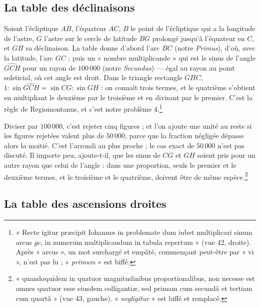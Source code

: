\documentclass[11pt,a4paper]{article}
\begin{document}
\subsection*{La table des déclinaisons}

Soient l'écliptique $AB$, l'équateur $AC$, $B$ le point de l'écliptique qui a la
longitude de l'astre, $G$ l'astre sur le cercle de latitude $BG$ prolongé jusqu'à
l'équateur en $C$, et $GH$ sa déclinaison. La table donne d'abord l'arc $BC$
(notre \emph{Primus}), d'où, avec la latitude, l'arc $GC$ ; puis un « nombre
multiplicande » qui est le sinus de l'angle $\widehat{GCH}$ pour un rayon de
$100\,000$ (notre \emph{Secundus}) — égal au rayon au point solsticial, où cet
angle est droit. Dans le triangle rectangle $GHC$, $1 : \sin\widehat{GCH} = \sin
CG : \sin GH$ : on connaît trois termes, et le quatrième s'obtient en multipliant
le deuxième par le troisième et en divisant par le premier. C'est la règle de
Regiomontanus, et c'est notre problème 4.\footnote{« Recte igitur præcipit
Iohannes in problemate dum iubet multiplicari sinum arcus $gc$, in numerum
multiplicandum in tabula repertum » (vue 42, droite). Après « arcus », un mot
surchargé et empâté, commençant peut-être par « vi », n'est pas lu ;
« \emph{primum} » est biffé.}

Diviser par $100\,000$, c'est rejeter cinq figures ; et l'on ajoute une unité au
reste si les figures rejetées valent plus de $50\,000$, parce que la fraction
négligée dépasse alors la moitié. C'est l'arrondi au plus proche ; le cas exact
de $50\,000$ n'est pas discuté. Il importe peu, ajoute-t-il, que les sinus de
$CG$ et $GH$ soient pris pour un autre rayon que celui de l'angle : dans une
proportion, seuls le premier et le deuxième termes, et le troisième et le
quatrième, doivent être de même espèce.\footnote{« quandoquidem in quatuor
magnitudinibus proportionalibus, non necesse est omnes quatuor esse eiusdem
colligantiæ, sed primam cum secundâ et tertiam cum quartâ » (vue 43,
gauche). « \emph{negligitur} » est biffé et remplacé.}

\subsection*{La table des ascensions droites}
\end{document}
